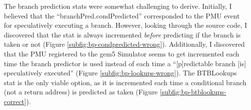     The branch prediction stats were somewhat challenging to derive. Initially,
    I believed that the ``\textsf{branchPred.condPredicted}'' corresponded to 
    the PMU event for speculatively executing a branch. However, looking 
    through the source code, I discovered that the stat is always incremented 
    \textit{before} predicting if the branch is taken or not (Figure 
    \ref{subfig:bp-condpredicted-wrong}). Additionally, I discovered that the 
    PMU registered to the gem5 Simulator seems to get incremented each time the 
    branch predictor is used instead of each time a ``[p]redictable branch [is] 
    speculatively executed'' (Figure \ref{subfig:bp-lookups-wrong}). The 
    \textsf{BTBLookups} stat is the only viable option, as it is incremented 
    each time a conditional branch (not a return address) is predicted as taken 
    (Figure \ref{subfig:bp-btblookups-correct}).

